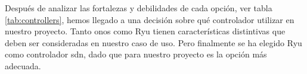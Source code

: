 

Después de analizar las fortalezas y debilidades de cada opción, ver tabla \ref{tab:controllers}, hemos llegado a una decisión sobre qué controlador utilizar en nuestro proyecto. Tanto \gls{onos} como Ryu tienen características distintivas que deben ser consideradas en nuestro caso de uso. Pero finalmente se ha elegido Ryu como controlador \gls{sdn}, dado que para nuestro proyecto es la opción más adecuada.